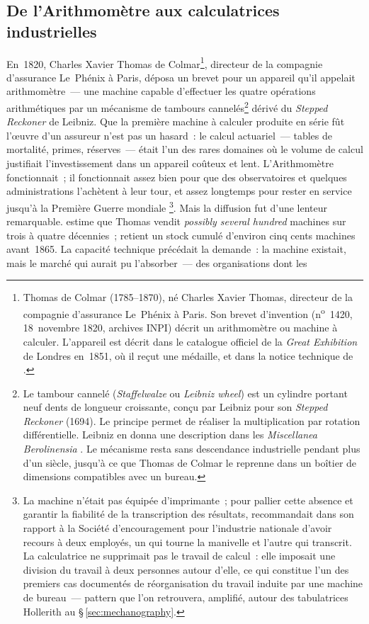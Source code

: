 \subsection{De l'Arithmomètre aux calculatrices industrielles}\label{subsec:arithmometre}

En~1820, Charles Xavier Thomas de Colmar\footnote{Thomas de Colmar (1785--1870), né Charles Xavier Thomas, directeur de la compagnie d'assurance Le~Phénix à Paris. Son brevet d'invention (n\textsuperscript{o}~1420, 18~novembre 1820, archives INPI) décrit un \og arithmomètre ou machine à calculer\fg{}. L'appareil est décrit dans le catalogue officiel de la \emph{Great Exhibition} de Londres en~1851, où il reçut une médaille, et dans la notice technique de \textcite{sebert_machines_1879}.}, directeur de la compagnie d'assurance Le~Phénix à Paris, déposa un brevet pour un appareil qu'il appelait \og arithmomètre\fg{}~--- une machine capable d'effectuer les quatre opérations arithmétiques par un mécanisme de tambours cannelés\footnote{Le tambour cannelé (\emph{Staffelwalze} ou \emph{Leibniz wheel}) est un cylindre portant neuf dents de longueur croissante, conçu par Leibniz pour son \emph{Stepped Reckoner} (1694). Le principe permet de réaliser la multiplication par rotation différentielle. Leibniz en donna une description dans les \emph{Miscellanea Berolinensia} \parencite{leibniz_machina_1710}. Le mécanisme resta sans descendance industrielle pendant plus d'un siècle, jusqu'à ce que Thomas de Colmar le reprenne dans un boîtier de dimensions compatibles avec un bureau.} dérivé du \emph{Stepped Reckoner} de Leibniz. Que la première machine à calculer produite en série fût l'\oe{}uvre d'un assureur n'est pas un hasard~: le calcul actuariel~--- tables de mortalité, primes, réserves~--- était l'un des rares domaines où le volume de calcul justifiait l'investissement dans un appareil coûteux et lent. L'Arithmomètre fonctionnait~; il fonctionnait assez bien pour que des observatoires et quelques administrations l'achètent à leur tour, et assez longtemps pour rester en service jusqu'à la Première Guerre mondiale \parencite{cortada_before_1993, sebert_machines_1879}\footnote{La machine n'était pas équipée d'imprimante~; pour pallier cette absence et garantir la fiabilité de la transcription des résultats, \textcite{sebert_machines_1879} recommandait dans son rapport à la Société d'encouragement pour l'industrie nationale d'avoir recours à \og deux employés, un qui tourne la manivelle et l'autre qui transcrit\fg{}. La calculatrice ne supprimait pas le travail de calcul~: elle imposait une division du travail à deux personnes autour d'elle, ce qui constitue l'un des premiers cas documentés de réorganisation du travail induite par une machine de bureau~--- pattern que l'on retrouvera, amplifié, autour des tabulatrices Hollerith au \S\,\ref{sec:mechanography}.}. Mais la diffusion fut d'une lenteur remarquable. \textcite{cortada_before_1993} estime que Thomas vendit \og \emph{possibly several hundred}\fg{} machines sur trois à quatre décennies~; \textcite{nordhaus_two_2007} retient un stock cumulé d'environ cinq cents machines avant~1865. La capacité technique précédait la demande~: la machine existait, mais le marché qui aurait pu l'absorber~--- des organisations dont les 